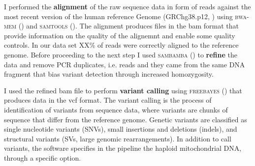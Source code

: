 I performed the \textbf{alignment} of the raw sequence data in form of \gls{reads} against the most recent version of the human reference Genome (GRChg38.p12, \cite{rosenbloom2015ucsc}) using \textsc{bwa-mem} (\cite{li2013aligning}) and \textsc{samtools} (\cite{li2009sequence}). The alignment produces files in the \gls{bam} format that provide information on the quality of the alignemnt and enable some quality controls. In our data set XX\% of reads were correctly aligned to the reference genome. \newline
Before proceeding to the next step I used \textsc{sambamba} (\cite{tarasov2015sambamba}) to \textbf{refine} the data and remove PCR duplicates, i.e. reads and they came from the same DNA fragment that bias variant detection through increased homozygosity.\newline

I used the refined bam file to perform \textbf{variant calling} using \textsc{freebayes} (\cite{garrison2012haplotype}) that produces data in the \gls{vcf} format. The variant calling is the process of identification of variants from sequence data, where variants are chunks of sequence that differ from the reference genome. Genetic variants are classified as single nucleotide variants (SNVs), small insertions and deletions (indels), and structural variants (SVs, large genomic rearrangements). In addition to call variants, the software specifies in the pipeline the haploid mitochondrial DNA, through a specific option. \newline





